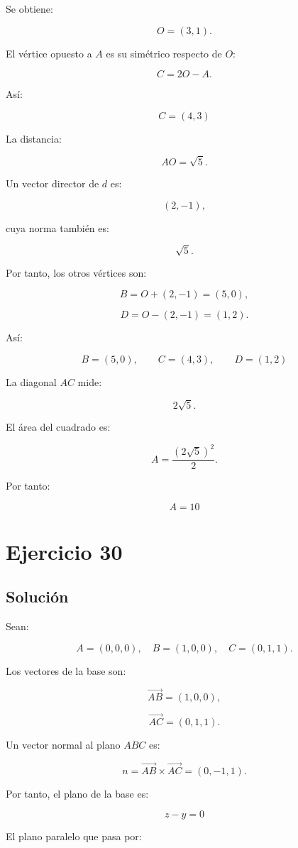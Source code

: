 \documentclass[11pt,a4paper]{article}
\begin{document}
Se obtiene:

\[
O=(3,1).
\]

El vértice opuesto a \(A\) es su simétrico respecto de \(O\):

\[
C=2O-A.
\]

Así:

\[
\boxed{
C=(4,3)
}
\]

La distancia:

\[
AO=\sqrt5.
\]

Un vector director de \(d\) es:

\[
(2,-1),
\]

cuya norma también es:

\[
\sqrt5.
\]

Por tanto, los otros vértices son:

\[
B=O+(2,-1)=(5,0),
\]

\[
D=O-(2,-1)=(1,2).
\]

Así:

\[
\boxed{
B=(5,0),
\qquad
C=(4,3),
\qquad
D=(1,2)
}
\]

La diagonal \(AC\) mide:

\[
2\sqrt5.
\]

El área del cuadrado es:

\[
A
=
\frac{(2\sqrt5)^2}{2}.
\]

Por tanto:

\[
\boxed{
A=10
}
\]

\section{Ejercicio 30}
\subsection{Solución}

Sean:

\[
A=(0,0,0),
\quad
B=(1,0,0),
\quad
C=(0,1,1).
\]

Los vectores de la base son:

\[
\overrightarrow{AB}=(1,0,0),
\]

\[
\overrightarrow{AC}=(0,1,1).
\]

Un vector normal al plano \(ABC\) es:

\[
n
=
\overrightarrow{AB}\times\overrightarrow{AC}
=
(0,-1,1).
\]

Por tanto, el plano de la base es:

\[
\boxed{
z-y=0
}
\]

El plano paralelo que pasa por:
\end{document}
